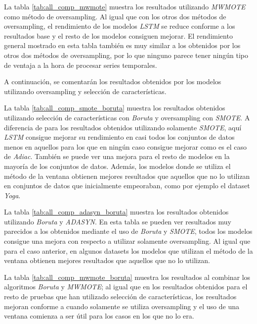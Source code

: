 La tabla \ref{tab:all_comp_mwmote} muestra los resultados utilizando \textit{MWMOTE} como método de oversampling. Al igual que con los otros dos métodos de oversampling, el rendimiento de los modelos \textit{LSTM} se reduce conforme a los resultados base y el resto de los modelos consiguen mejorar. El rendimiento general mostrado en esta tabla también es muy similar a los obtenidos por los otros dos métodos de oversampling, por lo que ninguno parece tener ningún tipo de ventaja a la hora de procesar series temporales. \newline

A continuación, se comentarán los resultados obtenidos por los modelos utilizando oversampling y selección de características.\newline

La tabla \ref{tab:all_comp_smote_boruta} muestra los resultados obtenidos utilizando selección de características con \textit{Boruta} y oversampling con \textit{SMOTE}. A diferencia de para los resultados obtenidos utilizando solamente \textit{SMOTE}, aquí \textit{LSTM} consigue mejorar su rendimiento en casi todos los conjuntos de datos menos en aquellos para los que en ningún caso consigue mejorar como es el caso de \textit{Adiac}. También se puede ver una mejora para el resto de modelos en la mayoría de los conjuntos de datos. Además, los modelos donde se utiliza el método de la ventana obtienen mejores resultados que aquellos que no lo utilizan en conjuntos de datos que inicialmente empeoraban, como por ejemplo el dataset \textit{Yoga}.\newline

La tabla \ref{tab:all_comp_adasyn_boruta} muestra los resultados obtenidos utilizando \textit{Boruta} y \textit{ADASYN}. En esta tabla se pueden ver resultados muy parecidos a los obtenidos mediante el uso de \textit{Boruta} y \textit{SMOTE}, todos los modelos consigue una mejora con respecto a utilizar solamente oversampling. Al igual que para el caso anterior, en algunos datasets los modelos que utilizan el método de la ventana obtienen mejores resultados que aquellos que no lo utilizan.\newline

La tabla \ref{tab:all_comp_mwmote_boruta} muestra los resultados al combinar los algoritmos \textit{Boruta} y \textit{MWMOTE}; al igual que en los resultados obtenidos para el resto de pruebas que han utilizado selección de características, los resultados mejoran conforme a cuando solamente se utiliza oversampling y el uso de una ventana comienza a ser útil para los casos en los que no lo era.

